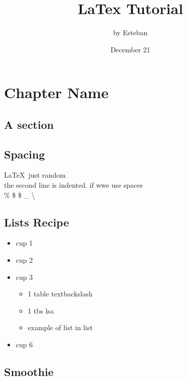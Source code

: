 \documentclass[a4paper,12pt]{book}
\begin{document}
    \title{\Large{\textbf{LaTex Tutorial}}}
    \author{by Esteban}
    \date{December 21}
    \maketitle

    \let\cleardoublepage\clearpage

    \tableofcontents
    \setcounter{page}{2}
   

    \chapter{Chapter Name}
    \blindmathtrue
    \blindtext[3]
    \enlargethispage{\baselineskip}

    \section { A section}
    \blindtext[2]
    \enlargethispage{\baselineskip}
    \blinditemize
    \blindenumerate
    \blinddescription

    \section*{Spacing}
    \LaTeX\
    just random\\
    the second line is indented. if  wwe  use spaces \\[10pt]
    \% \$ \$ \_ \textbackslash


    \section[List]{Lists Recipe }
    
    \begin{itemize}
        \item  cup 1
        \item  cup 2
        \item  cup 3
        \begin{itemize}
            \item 1 table textbackslash
            \item 1 tbs lsa
            \item example of list in list
        \end{itemize}
        \item cup 6
    \end{itemize}

    \section {Smoothie}
    \blindtext[2]
    \enlargethispage{\baselineskip}
 
\end{document}
